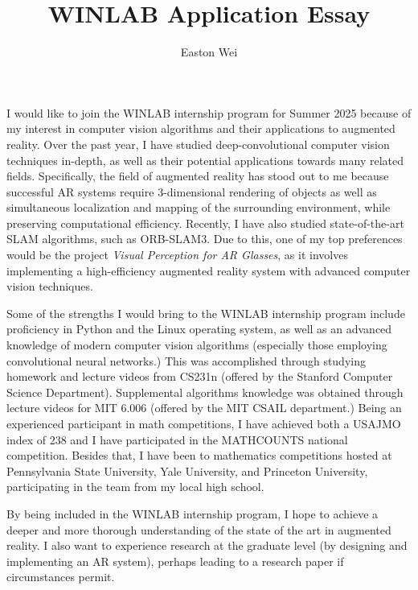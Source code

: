 \documentclass[11pt]{scrartcl}
\begin{document}
\title{WINLAB Application Essay}
\author{Easton Wei}
I would like to join the WINLAB internship program for Summer 2025
because of my interest in computer vision algorithms and their
applications to augmented reality. Over the past year, I
have studied deep-convolutional computer vision techniques in-depth,
as well as their potential applications towards many related fields.
Specifically, the field of augmented reality has stood out to me
because successful AR systems require 3-dimensional rendering of objects
as well as simultaneous localization and mapping of the surrounding environment,
while preserving computational efficiency. Recently, I have also studied
state-of-the-art SLAM algorithms, such as ORB-SLAM3.
Due to this, one of my top preferences would be the project
\textit{Visual Perception for AR Glasses}, as it involves implementing
a high-efficiency augmented reality system with advanced
computer vision techniques.

Some of the strengths I would bring to the WINLAB internship program
include proficiency in Python and the Linux operating system,
as well as an advanced knowledge of modern computer vision algorithms
(especially those employing convolutional neural networks.)
This was accomplished through studying homework and lecture videos
from CS231n (offered by the Stanford Computer Science Department).
Supplemental algorithms knowledge was obtained through lecture
videos for MIT 6.006 (offered by the MIT CSAIL department.)
Being an experienced participant in math competitions, I have achieved
both a USAJMO index of 238 and I have participated in the MATHCOUNTS
national competition. Besides that, I have been to mathematics competitions
hosted at Pennsylvania State University, Yale University, and Princeton
University, participating in the team from my local high school.

By being included in the WINLAB internship program,
I hope to achieve a deeper and more thorough understanding of the
state of the art in augmented reality. I also want to experience
research at the graduate level (by designing and implementing an AR
system), perhaps leading to a
research paper if circumstances permit.
\end{document}
